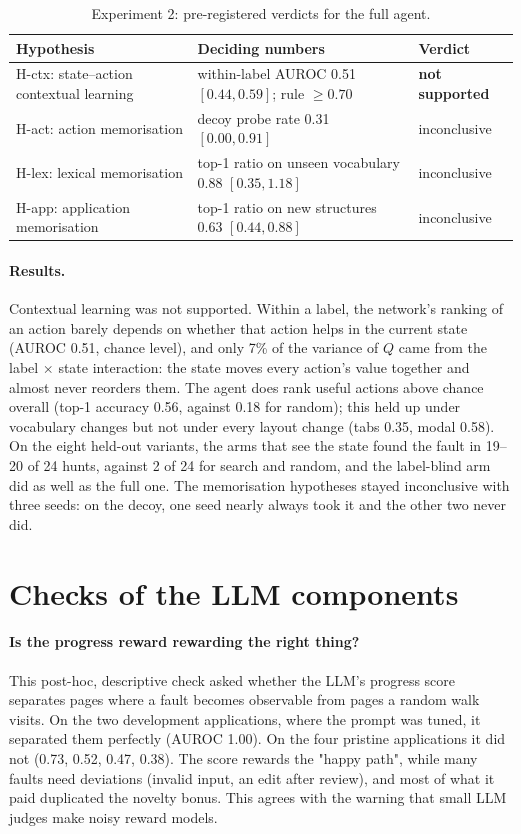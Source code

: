 \begin{table}[H]
\centering
\small
\caption{Experiment 2: pre-registered verdicts for the full agent.}
\label{tab:exp2}
\begin{tabularx}{\textwidth}{@{}lXl@{}}
\toprule
Hypothesis & Deciding numbers & Verdict \\
\midrule
H-ctx: state--action contextual learning & within-label AUROC 0.51 $[0.44, 0.59]$; rule $\ge 0.70$ & \textbf{not supported} \\
H-act: action memorisation & decoy probe rate 0.31 $[0.00, 0.91]$ & inconclusive \\
H-lex: lexical memorisation & top-1 ratio on unseen vocabulary 0.88 $[0.35, 1.18]$ & inconclusive \\
H-app: application memorisation & top-1 ratio on new structures 0.63 $[0.44, 0.88]$ & inconclusive \\
\bottomrule
\end{tabularx}
\end{table}

\paragraph{Results.} Contextual learning was not supported. Within a label, the network's
ranking of an action barely depends on whether that action helps in the current state
(AUROC 0.51, chance level), and only 7\% of the variance of $Q$ came from the label $\times$
state interaction: the state moves every action's value together and almost never reorders
them. The agent does rank useful actions above chance overall (top-1 accuracy 0.56, against
0.18 for random); this held up under vocabulary changes but not under every layout change
(tabs 0.35, modal 0.58). On the eight held-out variants, the arms that see the state found
the fault in 19--20 of 24 hunts, against 2 of 24 for search and random, and the label-blind
arm did as well as the full one. The memorisation hypotheses stayed inconclusive with three
seeds: on the decoy, one seed nearly always took it and the other two never did.

\section{Checks of the LLM components}
\label{sec:llm-checks}

\paragraph{Is the progress reward rewarding the right thing?} This post-hoc, descriptive
check asked whether the LLM's progress score separates pages where a fault becomes
observable from pages a random walk visits. On the two development applications, where the
prompt was tuned, it separated them perfectly (AUROC 1.00). On the four pristine
applications it did not (0.73, 0.52, 0.47, 0.38). The score rewards the "happy path", while
many faults need deviations (invalid input, an edit after review), and most of what it paid
duplicated the novelty bonus. This agrees with the warning that small LLM judges make noisy
reward models.


